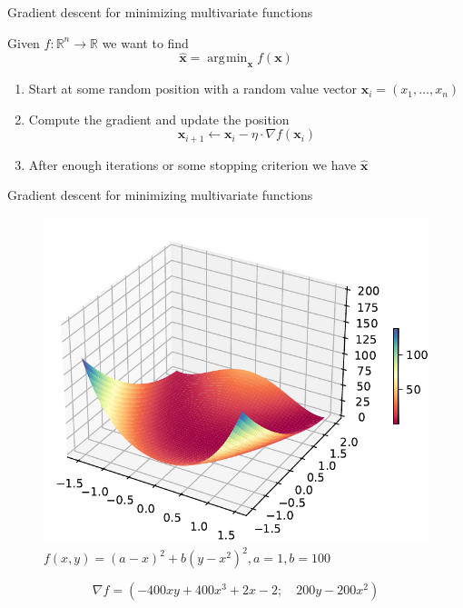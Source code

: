 \documentclass[12pt,aspectratio=169]{beamer}
\DeclareMathOperator*{\argmin}{arg\!\min}
\begin{document}
\begin{frame}{Gradient descent for minimizing multivariate functions}
	
Given $f: \mathbb{R}^n \to \mathbb{R}$ we want to find
$$\hat{\bm{x}} = \argmin_{\bm{x}} f(\bm{x})$$

\begin{enumerate}
	\item Start at some random position with a random value vector $\bm{x}_i = (x_1, \ldots, x_n)$
	\item Compute the gradient and update the position
	$$
	\bm{x}_{i + 1} \gets \bm{x}_i - \eta \cdot \nabla f (\bm{x}_i)
	$$
	\item After enough iterations or some stopping criterion we have $\hat{\bm{x}}$
\end{enumerate}

	
	
\end{frame}

\begin{frame}{Gradient descent for minimizing multivariate functions}

\begin{figure}
	\centering
	\includegraphics[width=0.40\linewidth]{img/rosenbrock.pdf}
	\caption{$f(x,y)=(a-x)^{2}+b(y-x^{2})^{2}, a = 1, b = 100$}
\end{figure}
$$\nabla f = \left(-400xy+400x^3+2x-2; \quad 200y-200x^2 \right)$$
	
\end{frame}
\end{document}
